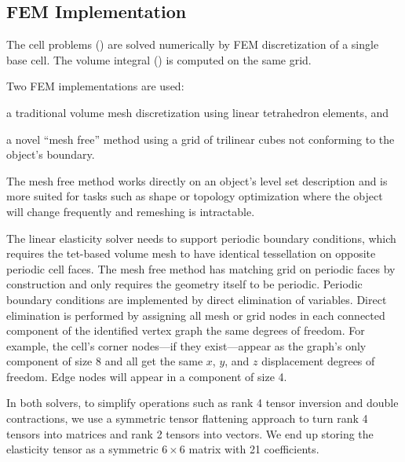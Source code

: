 \documentclass[twocolumn,10pt]{article}
\begin{document}
\subsection{FEM Implementation}
The cell problems () are solved numerically by FEM
discretization of a single base cell. The volume integral
() is computed on the same grid.

Two FEM implementations are used:
\begin{inparaenum}[(i)]
\item a traditional volume mesh discretization using linear
  tetrahedron elements, and
\item a novel ``mesh free'' method using a grid of trilinear cubes not
  conforming to the object's boundary.
\end{inparaenum}
The mesh free method works directly on an object's level set
description and is more suited for tasks such as shape or topology
optimization where the object will change frequently and remeshing is
intractable.

The linear elasticity solver needs to support periodic boundary
conditions, which requires the tet-based volume mesh to have identical
tessellation on opposite periodic cell faces. The mesh free method has
matching grid on periodic faces by construction and only requires the
geometry itself to be periodic. Periodic boundary conditions are
implemented by direct elimination of variables. Direct elimination is
performed by assigning all mesh or grid nodes in each connected
component of the identified vertex graph the same degrees of
freedom. For example, the cell's corner nodes---if they exist---appear
as the graph's only component of size 8 and all get the same $x$, $y$,
and $z$ displacement degrees of freedom. Edge nodes will appear in a
component of size 4.

In both solvers, to simplify operations such as rank 4 tensor
inversion and double contractions, we use a symmetric tensor
flattening approach to turn rank 4 tensors into matrices and rank 2
tensors into vectors. We end up storing the elasticity tensor as a
symmetric $6\times 6$ matrix with 21 coefficients.

\appendix
\end{document}
